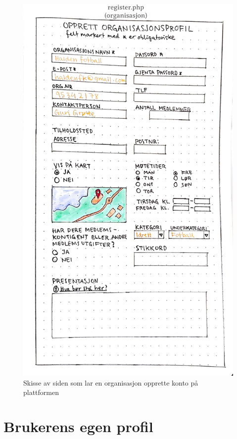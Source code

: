 \begin{figure}[H]
\centering
\includegraphics[width=.7\textwidth]{Illustrasjoner/Skisser/1.0/1-15-registering-organisasjon.jpg}
\caption{Skisse av siden som lar en organisasjon opprette konto på plattformen}
\label{vedlegg:1-15-reg-org}
\end{figure}

\section{Brukerens egen profil}

